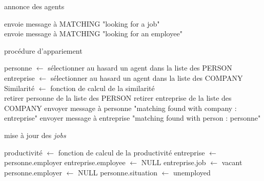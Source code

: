 \documentclass[10pt,a4paper]{article}
\begin{document}
    \begin{algorithm}[H]
    \caption{annonce des agents}
    \SetAlgoLined
     {
      {
       {
       envoie message à MATCHING "looking for a job"\\
      }
     }
      {
       {
       envoie message à MATCHING "looking for an employee"\\
      }
     }
    }
    \end{algorithm}
    
    \vspace{0.5cm}
    
    \begin{algorithm}[H]
    \caption{procédure d'appariement}
    \SetAlgoLined
     {
     personne $\gets$ sélectionner au hasard un agent dans la liste des PERSON\\
     entreprise $\gets$ sélectionner au hasard un agent dans la liste des COMPANY\\
     Similarité $\gets$ fonction de calcul de la similarité \\
      {
      retirer personne de la liste des PERSON
      retirer entreprise de la liste des COMPANY
      envoyer message à personne "matching found with company : entreprise"
      envoyer message à entreprise "matching found with person : personne"
     }   
    }
    \end{algorithm}
    
    \vspace{0.5cm}
    
    \begin{algorithm}[H]
    \caption{mise à jour des \emph{jobs}}
    \SetAlgoLined
     {  
     productivité $\gets$ fonction de calcul de la productivité
     entreprise $\gets$ personne.employer
      {
      entreprise.employee $\gets$ NULL
      entreprise.job $\gets$ vacant
      personne.employer $\gets$ NULL
      personne.situation $\gets$ unemployed
     } 
    }
    \end{algorithm}
    
\end{document}
